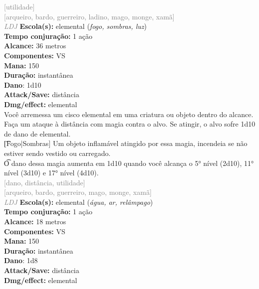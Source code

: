 \documentclass{RPG_Adventure}[2021/10/20]
\begin{document}
{\scriptsize \textcolor{gray}{[utilidade]\\}}
{\scriptsize \textcolor{gray}{[arqueiro, bardo, guerreiro, ladino, mago, monge, xamã]\\}}
{\tiny \textcolor{gray}{\textit{LDJ}}}\jump{}
{\small \t \textbf{Escola(s):} elemental (\textit{fogo, sombras, luz})\\\t \textbf{Tempo conjuração:} 1 ação\\\t \textbf{Alcance:} 36 metros\\\t \textbf{Componentes:} VS\\\t \textbf{Mana:} 150\\\t \textbf{Duração:} instantânea\\\t \textbf{Dano}: 1d10\\\t \textbf{Attack/Save:} distância\\\t \textbf{Dmg/effect:} elemental\\}
{\normalsize Você arremessa um cisco elemental em uma criatura ou objeto dentro do alcance. Faça um ataque à distância com magia contra o alvo. Se atingir, o alvo sofre 1d10 de dano de elemental.\\\t [Fogo|Sombras] Um objeto inflamável atingido por essa magia, incendeia se não estiver sendo vestido ou carregado.\\\t O dano dessa magia aumenta em 1d10 quando você alcança o 5° nível (2d10), 11° nível (3d10) e 17° nível (4d10).\\}
{\scriptsize \textcolor{gray}{[dano, distância, utilidade]\\}}
{\scriptsize \textcolor{gray}{[arqueiro, bardo, guerreiro, mago, monge, xamã]\\}}
{\tiny \textcolor{gray}{\textit{LDJ}}}\jump{}
{\small \t \textbf{Escola(s):} elemental (\textit{água, ar, relâmpago})\\\t \textbf{Tempo conjuração:} 1 ação\\\t \textbf{Alcance:} 18 metros\\\t \textbf{Componentes:} VS\\\t \textbf{Mana:} 150\\\t \textbf{Duração:} instantânea\\\t \textbf{Dano}: 1d8\\\t \textbf{Attack/Save:} distância\\\t \textbf{Dmg/effect:} elemental\\}
\end{document}
